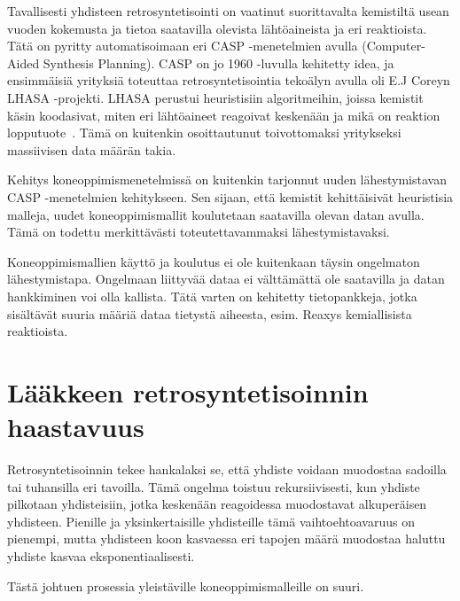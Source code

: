 \documentclass[finnish,twoside,censored,tkt,sw-line]{HYthesisML}
\begin{document}
Tavallisesti yhdisteen retrosyntetisointi on vaatinut suorittavalta kemistiltä usean vuoden kokemusta ja tietoa saatavilla olevista lähtöaineista ja eri reaktioista.
Tätä on pyritty automatisoimaan eri CASP -menetelmien avulla (Computer-Aided Synthesis Planning).
CASP on jo 1960 -luvulla kehitetty idea, ja ensimmäisiä yrityksiä toteuttaa retrosyntetisointia tekoälyn avulla oli E.J Coreyn LHASA -projekti.
LHASA perustui heuristisiin algoritmeihin, joissa kemistit käsin koodasivat, miten eri lähtöaineet reagoivat keskenään ja mikä on reaktion lopputuote~\cite{LHASA}.
Tämä on kuitenkin osoittautunut toivottomaksi yritykseksi massiivisen data määrän takia.

Kehitys koneoppimismenetelmissä on kuitenkin tarjonnut uuden lähestymistavan CASP -menetelmien kehitykseen.
Sen sijaan, että kemistit kehittäisivät heuristisia malleja, uudet koneoppimismallit koulutetaan saatavilla olevan datan avulla.
Tämä on todettu merkittävästi toteutettavammaksi lähestymistavaksi.

Koneoppimismallien käyttö ja koulutus ei ole kuitenkaan täysin ongelmaton lähestymistapa.
Ongelmaan liittyvää dataa ei välttämättä ole saatavilla ja datan hankkiminen voi olla kallista.
Tätä varten on kehitetty tietopankkeja, jotka sisältävät suuria määriä dataa tietystä aiheesta, esim. Reaxys kemiallisista reaktioista.

\section{Lääkkeen retrosyntetisoinnin haastavuus}

Retrosyntetisoinnin tekee hankalaksi se, että yhdiste voidaan muodostaa sadoilla tai tuhansilla eri tavoilla.
Tämä ongelma toistuu rekursiivisesti, kun yhdiste pilkotaan yhdisteisiin, jotka keskenään reagoidessa muodostavat alkuperäisen yhdisteen.
Pienille ja yksinkertaisille yhdisteille tämä vaihtoehtoavaruus on pienempi, mutta yhdisteen koon kasvaessa eri tapojen määrä muodostaa haluttu yhdiste kasvaa eksponentiaalisesti.

Tästä johtuen prosessia yleistäville koneoppimismalleille on suuri.
\end{document}
